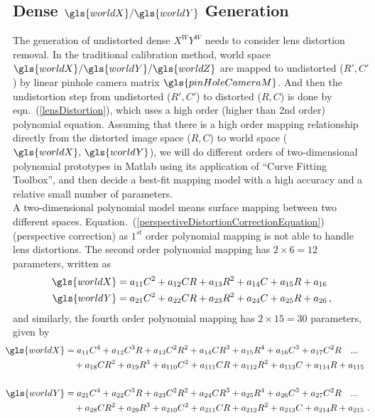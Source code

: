 \subsection{Dense \(\gls{worldX}/\gls{worldY}\) Generation}
\indent
The generation of undistorted dense \(X^WY^W\) needs to consider lens distortion removal. In the traditional calibration method, world space \(\gls{worldX}/\gls{worldY}/\gls{worldZ}\) are mapped to undistorted (\(R', C'\)) by linear pinhole camera matrix \(\gls{pinHoleCameraM}\). And then the undistortion step from undistorted (\(R', C'\)) to distorted (\(R, C\)) is done by eqn.~(\ref{lensDistortion}), which uses a high order (higher than 2nd order) polynomial equation. Assuming that there is a high order mapping relationship directly from the distorted image space (\(R, C\)) to world space (\(\gls{worldX}, \, \gls{worldY}\)), we will do different orders of two-dimensional polynomial prototypes in Matlab using its application of \enquote{Curve Fitting Toolbox}, and then decide a best-fit mapping model with a high accuracy and a relative small number of parameters.
%
\\\indent
A two-dimensional polynomial model means surface mapping between two different spaces. Equation.~(\ref{perspectiveDistortionCorrectionEquation}) (perspective correction) as \(1^{st}\) order polynomial mapping is not able to handle lens distortions. 
%
The second order polynomial mapping has $2\times6=12$ parameters, written as %
%
\begin{equation}
\begin{aligned}
\gls{worldX} &=  a_{11}C^2 + a_{12}CR + a_{13}R^2 + a_{14}C + a_{15}R + a_{16}
\\%
\gls{worldY} &=  a_{21}C^2 + a_{22}CR + a_{23}R^2 + a_{24}C + a_{25}R + a_{26} \, , 
\end{aligned}
\label{secondOrderPolynomial}
\end{equation}%
%
\noindent
and similarly, the fourth order polynomial mapping has $2\times15=30$ parameters, given by 
%
\begin{equation}
\hspace*{-0.3cm}%
\begin{aligned}
\gls{worldX} &=  a_{11}C^4 + a_{12}C^3R + a_{13}C^2R^2 + a_{14}CR^3 + a_{15}R^4 + a_{16}C^3 + a_{17}C^2R \ \ \ ...\\%
&\,\,\,\,\,\,+ a_{18}CR^2 + a_{19}R^3 + a_{110}C^2 + a_{111}CR + a_{112}R^2 + a_{113}C + a_{114}R + a_{115}
\\\\%
\gls{worldY} &=  a_{21}C^4 + a_{22}C^3R + a_{23}C^2R^2 + a_{24}CR^3 + a_{25}R^4 + a_{26}C^3 + a_{27}C^2R \ \ \ ...\\%
&\,\,\,\,\,\,+ a_{28}CR^2 + a_{29}R^3 + a_{210}C^2 + a_{211}CR + a_{212}R^2 + a_{213}C + a_{214}R + a_{215}      \,\,.
\end{aligned}
\label{fourthOrderPolynomial}
\end{equation}%
